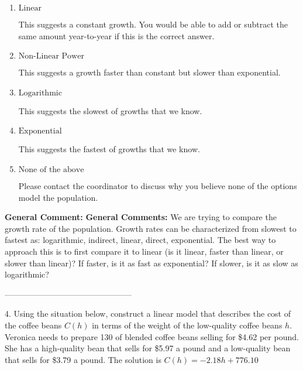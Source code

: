 \documentclass{extbook}[14pt]
\begin{document}
\begin{enumerate}[label=\Alph*.] 
\item $ \text{Linear} $ 

 This suggests a constant growth. You would be able to add or subtract the same amount year-to-year if this is the correct answer. 
\item $ \text{Non-Linear Power} $ 

 This suggests a growth faster than constant but slower than exponential. 
\item $ \text{Logarithmic} $ 

 This suggests the slowest of growths that we know. 
\item $ \text{Exponential} $ 

 This suggests the fastest of growths that we know. 
\item $ \text{None of the above} $ 

 Please contact the coordinator to discuss why you believe none of the options model the population. 
\end{enumerate} 
 
\textbf{General Comment:} \textbf{General Comments:} We are trying to compare the growth rate of the population. Growth rates can be characterized from slowest to fastest as: logarithmic, indirect, linear, direct, exponential. The best way to approach this is to first compare it to linear (is it linear, faster than linear, or slower than linear)? If faster, is it as fast as exponential? If slower, is it as slow as logarithmic? 

-----------------------------------------------

4. Using the situation below, construct a linear model that describes the cost of the coffee beans $C(h)$ in terms of the weight of the low-quality coffee beans $h$.
Veronica needs to prepare 130 of blended coffee beans selling for \$4.62 per pound. She has a high-quality bean that sells for \$5.97 a pound and a low-quality bean that sells for \$3.79 a pound. 
The solution is $ C(h) = -2.18 h + 776.10 $ 
\end{document}
